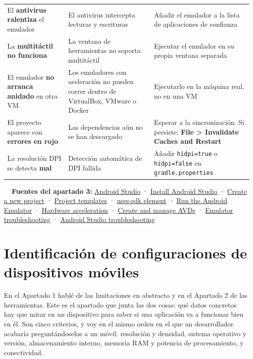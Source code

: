 \documentclass[11pt,a4paper]{article}
\newcommand{\code}[1]{\texttt{\color{ink}#1}}
\newcommand{\archivo}[1]{\texttt{\color{inkdim}#1}}
\begin{document}
\begin{xltabular}{\textwidth}{@{}>{\RaggedRight\arraybackslash}p{3.3cm} >{\RaggedRight\arraybackslash}p{4.5cm} >{\RaggedRight\arraybackslash}X@{}}
		El \textbf{antivirus ralentiza} el emulador & El antivirus intercepta lecturas y escrituras & Añadir el emulador a la lista de aplicaciones de confianza \\
		La \textbf{multitáctil no funciona} & La ventana de herramientas no soporta multitáctil & Ejecutar el emulador en su propia ventana separada \\
		El emulador \textbf{no arranca anidado} en otra VM & Los emuladores con aceleración no pueden correr dentro de VirtualBox, VMware o Docker & Ejecutarlo en la máquina real, no en una VM \\
		El proyecto aparece con \textbf{errores en rojo} & Las dependencias aún no se han descargado & Esperar a la sincronización. Si persiste: \textbf{File > Invalidate Caches and Restart} \\
		La resolución DPI se detecta \textbf{mal} & Detección automática de DPI fallida & Añadir \code{hidpi=true} o \code{hidpi=false} en \archivo{gradle.properties} \\
	\end{xltabular}
	
	\begin{fuentesbox}
		\textbf{\color{muted}\faBook\ \ Fuentes del apartado 3:}
		\href{https://developer.android.com/studio}{Android Studio} ·
		\href{https://developer.android.com/studio/install}{Install Android Studio} ·
		\href{https://developer.android.com/studio/projects/create-project}{Create a new project} ·
		\href{https://developer.android.com/studio/projects/templates}{Project templates} ·
		\href{https://developer.android.com/guide/topics/manifest/uses-sdk-element}{uses-sdk element} ·
		\href{https://developer.android.com/studio/run/emulator}{Run the Android Emulator} ·
		\href{https://developer.android.com/studio/run/emulator-acceleration}{Hardware acceleration} ·
		\href{https://developer.android.com/studio/run/managing-avds}{Create and manage AVDs} ·
		\href{https://developer.android.com/studio/run/emulator-troubleshooting}{Emulator troubleshooting} ·
		\href{https://developer.android.com/studio/troubleshoot}{Android Studio troubleshooting}
	\end{fuentesbox}
	
	\newpage
	\section{Identificación de configuraciones de dispositivos móviles}
	
	En el Apartado 1 hablé de las limitaciones en abstracto y en el Apartado 2 de las herramientas. Este es el apartado que junta las dos cosas: qué datos concretos hay que mirar en un dispositivo para saber si una aplicación va a funcionar bien en él. Son cinco criterios, y voy en el mismo orden en el que un desarrollador acabaría preguntándoselos a un móvil: resolución y densidad, sistema operativo y versión, almacenamiento interno, memoria RAM y potencia de procesamiento, y conectividad.
	
\end{document}
